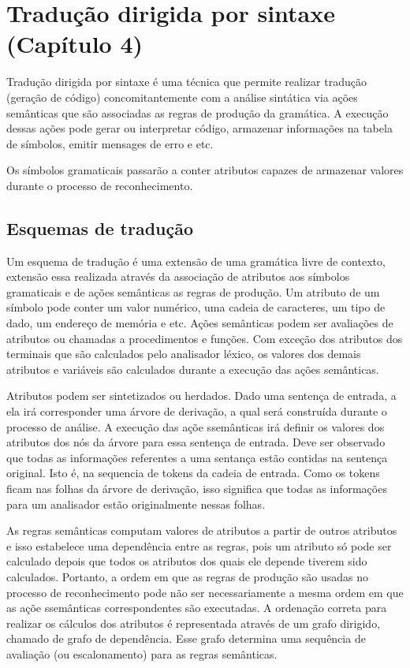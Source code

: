 \documentclass[11pt]{article}
\author{Lucas Peixoto}
\date{\today}
\title{}
\begin{document}
\tableofcontents

\section{Tradução dirigida por sintaxe (Capítulo 4)}
\label{sec:org9d6c23c}
Tradução dirigida por sintaxe é uma técnica que permite realizar
tradução (geração de código) concomitantemente com a análise
sintática via ações semânticas que são associadas as regras de
produção da gramática. A execução dessas ações pode gerar ou interpretar código,
armazenar informações na tabela de símbolos, emitir mensages de erro
e etc.

Os símbolos gramaticais passarão a conter atributos capazes de
armazenar valores durante o processo de reconhecimento. 

\subsection{Esquemas de tradução}
\label{sec:org7e389a7}
Um esquema de tradução é uma extensão de uma gramática livre de
contexto, extensão essa realizada através da associação de
atributos aos símbolos gramaticais e de ações semânticas as regras
de produção. Um atributo de um símbolo pode conter um valor
numérico, uma cadeia de caracteres, um tipo de dado, um endereço de
memória e etc. Ações semânticas podem ser avaliações de atributos
ou chamadas a procedimentos e funções. Com exceção dos atributos
dos terminais que são calculados pelo analisador léxico, os valores
dos demais atributos e variáveis são calculados durante a execução
das ações semânticas.

Atributos podem ser sintetizados ou herdados. Dado uma sentença de
entrada, a ela irá corresponder uma árvore de derivação, a qual
será construída durante o processo de análise. A execução das açõe
ssemânticas irá definir os valores dos atributos dos nós da árvore
para essa sentença de entrada. Deve ser observado que todas as
informações referentes a uma sentança estão contidas na sentença
original. Isto é, na sequencia de tokens da cadeia de entrada. Como
os tokens ficam nas folhas da árvore de derivação, isso significa
que todas as informações para um analisador estão originalmente
nessas folhas.

As regras semânticas computam valores de atributos a partir de
outros atributos e isso estabelece uma dependência entre as regras,
pois um atributo só pode ser calculado depois que todos os
atributos dos quais ele depende tiverem sido calculados. Portanto,
a ordem em que as regras de produção são usadas no processo de
reconhecimento pode não ser necessariamente a mesma ordem em que as
açõe ssemânticas correspondentes são executadas. A ordenação
correta para realizar os cálculos dos atributos é representada
através de um grafo dirigido, chamado de grafo de dependência. Esse
grafo determina uma sequência de avaliação (ou escalonamento) para
as regras semânticas.
\end{document}
